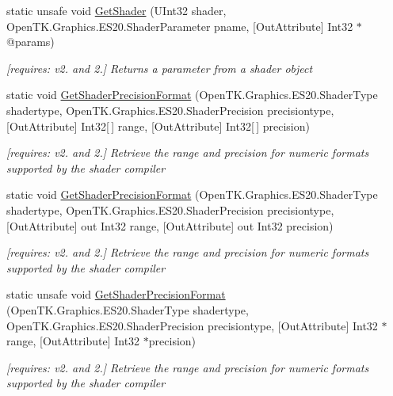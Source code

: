 \begin{DoxyCompactItemize}
static unsafe void \hyperlink{class_open_t_k_1_1_graphics_1_1_e_s20_1_1_g_l_aebd604e4635c3cbaf089464e27853eed}{Get\-Shader} (U\-Int32 shader, Open\-T\-K.\-Graphics.\-E\-S20.\-Shader\-Parameter pname, \mbox{[}Out\-Attribute\mbox{]} Int32 $\ast$@params)
\begin{DoxyCompactList}\small\item\em \mbox{[}requires\-: v2. and 2.\mbox{]} Returns a parameter from a shader object \end{DoxyCompactList}\item 
static void \hyperlink{class_open_t_k_1_1_graphics_1_1_e_s20_1_1_g_l_aa94705be101c4a72456ffe8d74355c60}{Get\-Shader\-Precision\-Format} (Open\-T\-K.\-Graphics.\-E\-S20.\-Shader\-Type shadertype, Open\-T\-K.\-Graphics.\-E\-S20.\-Shader\-Precision precisiontype, \mbox{[}Out\-Attribute\mbox{]} Int32\mbox{[}$\,$\mbox{]} range, \mbox{[}Out\-Attribute\mbox{]} Int32\mbox{[}$\,$\mbox{]} precision)
\begin{DoxyCompactList}\small\item\em \mbox{[}requires\-: v2. and 2.\mbox{]} Retrieve the range and precision for numeric formats supported by the shader compiler \end{DoxyCompactList}\item 
static void \hyperlink{class_open_t_k_1_1_graphics_1_1_e_s20_1_1_g_l_adad84370e4e14198e52b04170fd5e165}{Get\-Shader\-Precision\-Format} (Open\-T\-K.\-Graphics.\-E\-S20.\-Shader\-Type shadertype, Open\-T\-K.\-Graphics.\-E\-S20.\-Shader\-Precision precisiontype, \mbox{[}Out\-Attribute\mbox{]} out Int32 range, \mbox{[}Out\-Attribute\mbox{]} out Int32 precision)
\begin{DoxyCompactList}\small\item\em \mbox{[}requires\-: v2. and 2.\mbox{]} Retrieve the range and precision for numeric formats supported by the shader compiler \end{DoxyCompactList}\item 
static unsafe void \hyperlink{class_open_t_k_1_1_graphics_1_1_e_s20_1_1_g_l_afddfaa0d0b5a108653589de111ca68dd}{Get\-Shader\-Precision\-Format} (Open\-T\-K.\-Graphics.\-E\-S20.\-Shader\-Type shadertype, Open\-T\-K.\-Graphics.\-E\-S20.\-Shader\-Precision precisiontype, \mbox{[}Out\-Attribute\mbox{]} Int32 $\ast$range, \mbox{[}Out\-Attribute\mbox{]} Int32 $\ast$precision)
\begin{DoxyCompactList}\small\item\em \mbox{[}requires\-: v2. and 2.\mbox{]} Retrieve the range and precision for numeric formats supported by the shader compiler \end{DoxyCompactList}\item 

\end{DoxyCompactItemize}
